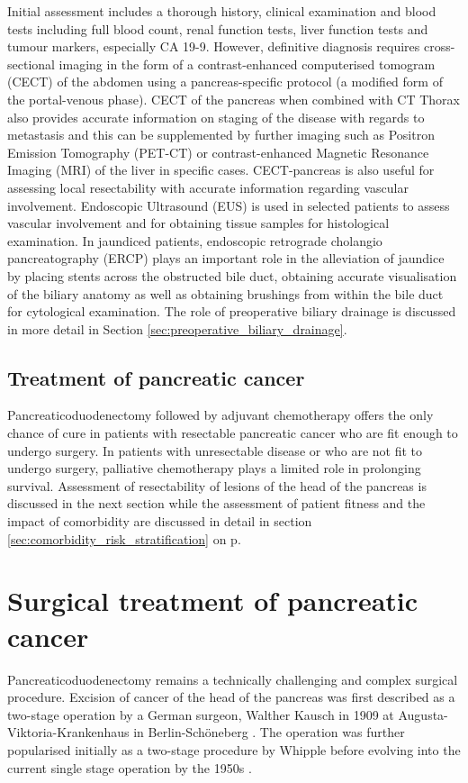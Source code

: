 Initial assessment includes a thorough history, clinical examination and blood tests including full blood count, renal function tests, liver function tests and tumour markers, especially CA 19-9. 
However, definitive diagnosis requires cross-sectional imaging in the form of a contrast-enhanced computerised tomogram (CECT) of the abdomen using a pancreas-specific protocol (a modified form of the portal-venous phase). 
CECT of the pancreas when combined with CT Thorax also provides accurate information on staging of the disease with regards to metastasis and this can be supplemented by further imaging such as Positron Emission Tomography (PET-CT) or contrast-enhanced Magnetic Resonance Imaging (MRI) of the liver in specific cases. 
CECT-pancreas is also useful for assessing local resectability with accurate information regarding vascular involvement. 
Endoscopic Ultrasound (EUS) is used in selected patients to assess vascular involvement and for obtaining tissue samples for histological examination. 
In jaundiced patients, endoscopic retrograde cholangio pancreatography (ERCP) plays an important role in the alleviation of jaundice by placing stents across the obstructed bile duct, obtaining accurate visualisation of the biliary anatomy as well as obtaining brushings from within the bile duct for cytological examination. 
The role of preoperative biliary drainage is discussed in more detail in Section \ref{sec:preoperative_biliary_drainage}.
	
\subsection{Treatment of pancreatic cancer}
Pancreaticoduodenectomy followed by adjuvant chemotherapy offers the only chance of cure in patients with resectable pancreatic cancer who are fit enough to undergo surgery. 
In patients with unresectable disease or who are not fit to undergo surgery, palliative chemotherapy plays a limited role in prolonging survival. 
Assessment of resectability of lesions of the head of the pancreas is discussed in the next section while the assessment of patient fitness and the impact of comorbidity are discussed in detail in section \ref{sec:comorbidity_risk_stratification} on p\pageref{sec:comorbidity_risk_stratification}.

\section{Surgical treatment of pancreatic cancer}
Pancreaticoduodenectomy remains a technically challenging and complex surgical procedure.%
Excision of cancer of the head of the pancreas was first described as a two-stage operation by a German surgeon, Walther Kausch in 1909 at Augusta-Viktoria-Krankenhaus in Berlin-Schöneberg \parencite{kausch_carcinom_1912}. 
The operation was further popularised initially as a two-stage procedure by Whipple \parencite{whipple_treatment_1935} before evolving into the current single stage operation by the 1950s \parencite{whipple_rationale_1941, whipple_radical_1950}.

